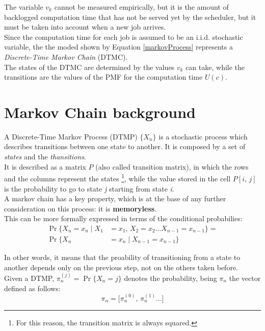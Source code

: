 The variable \( v_{k} \) cannot be measured empirically, but it is the amount of backlogged computation time that has not be served yet by the scheduler, but it must be taken into account when a new job arrives.\\
Since the computation time for each job is assumed to be an i.i.d. stochastic variable, the the moded shown by Equation \ref{markovProcess} represents a \emph{Discrete-Time Markov Chain} (DTMC).\\
The states of the DTMC are determined by the values \( v_{k} \) can take, while the transitions are the values of the PMF for the computation time \( U(c) \).

\section{Markov Chain background}
A Discrete-Time Markov Process (DTMP) \( \{X_{n}\} \) is a stochastic process which describes transitions between one state to another. It is composed by a set of \emph{states} and the \emph{thansitions}.\\
It is described as a matrix \( P \) (also called transition matrix), in which the rows and the columns represent the states \footnote{For this reason, the transition matrix is always squared.}, while the value stored in the cell \( P[i,\,j] \) is the probability to go to state \emph{j} starting from state \emph{i}.\\
A markov chain has a key property, which is at the base of any further consideration on this process: it is \textbf{memoryless}.\\
This can be more formally expressed in terms of the conditional probabilies:
\begin{equation} \tag{3} \label{memoryless}
\begin{split}
  \Pr\{X_{n} = x_{n} \mid X_{1} &= x_{1},\,X_{2} = x_{2} \dots X_{n-1} = x_{n-1} \} =\\
  \Pr\{X_{n} &= x_{n} \mid X_{n-1} = x_{n-1}  \}
\end{split}
\end{equation}

In other words, it means that the proability of transitioning from a state to another depends only on the previous step, not on the others taken before.\\
Given a DTMP, \( \pi_{n}^{(j)} = \Pr\{X_{n} = j\}\) denotes the probability, being \( \pi_{n} \) the vector defined as follows:
\begin{equation*}
  \pi_{n} =  \big[\pi_{n}^{(0)},\,\pi_{n}^{(1)} \dots \big]
\end{equation*}

